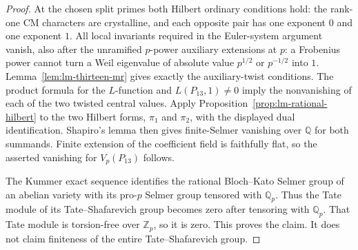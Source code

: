 \begin{proof}
At the chosen split primes both Hilbert ordinary conditions hold:
the rank-one CM characters are crystalline, and each opposite pair
has one exponent $0$ and one exponent $1$.  All local invariants
required in the Euler-system argument vanish, also after the
unramified $p$-power auxiliary extensions at $p$: a Frobenius power
cannot turn a Weil eigenvalue of absolute value $p^{1/2}$ or
$p^{-1/2}$ into $1$.  Lemma~\ref{lem:lm-thirteen-mr} gives exactly
the auxiliary-twist conditions.  The product formula for the
$L$-function and $L(P_{13},1)\ne0$ imply the nonvanishing of each
of the two twisted central values.  Apply
Proposition~\ref{prop:lm-rational-hilbert} to the two Hilbert forms,
$\pi_1$ and $\pi_2$, with the displayed dual identification.
Shapiro's lemma then
gives finite-Selmer vanishing over $\mathbb Q$ for both summands.
Finite extension of the coefficient field is faithfully flat,
so the asserted vanishing for $V_p(P_{13})$ follows.

The Kummer exact sequence identifies the rational Bloch--Kato
Selmer group of an abelian variety with its pro-$p$ Selmer group
tensored with $\mathbb Q_p$.  Thus the Tate module of its
Tate--Shafarevich group becomes zero after tensoring with
$\mathbb Q_p$.  That Tate module is torsion-free over $\mathbb Z_p$,
so it is zero.  This proves the claim.  It does not claim finiteness
of the entire Tate--Shafarevich group.
\end{proof}

